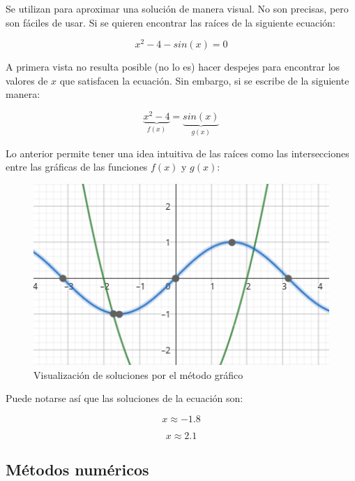 Se utilizan para aproximar una solución de manera visual. No son precisas, pero
son fáciles de usar. Si se quieren encontrar las raíces de la siguiente
ecuación:

\begin{equation}\label{primer-problema}
        x^2 - 4 - sin(x) = 0
\end{equation}

A primera vista no resulta posible (no lo es) hacer despejes para
encontrar los valores de \(x\) que satisfacen la ecuación. Sin embargo,
si se escribe de la siguiente manera:

\begin{equation*}{
        \underbrace{x^2 - 4}_{f(x)} = \underbrace{sin(x)}_{g(x)}
}\end{equation*}

Lo anterior permite tener una idea intuitiva de las raíces como las
intersecciones entre las gráficas de las funciones \(f(x)\) y \(g(x)\):

\begin{figure}[H]
    \centering
    \includegraphics[width=1.0\textwidth]{img/papu.png}
    \caption{Visualización de soluciones por el método gráfico}
\end{figure}

Puede notarse así que las soluciones de la ecuación son:

\begin{equation*}{
        x \approx -1.8
}\end{equation*}

\begin{equation*}{
        x \approx 2.1
}\end{equation*}

\subsection{Métodos numéricos}

